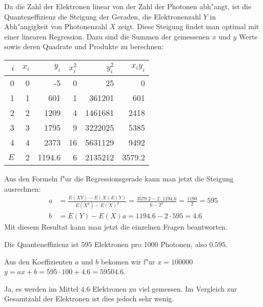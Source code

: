 \begin{loesung}
Da die Zahl der Elektronen linear von der Zahl der Photonen abh"angt,
ist die Quanteneffizienz die Steigung der Geraden, die Elektronenzahl $Y$
in Abh"angigkeit von Photonenzahl $X$ zeigt. Diese Steigung findet man
optimal mit einer linearen Regression. Dazu sind die Summen der gemessenen
$x$ und $y$ Werte sowie deren Quadrate und Produkte zu berechnen:
\begin{center}
\begin{tabular}{|r|rr|rr|r|}
\hline
$i$&$x_i$&$y_i$&$x_i^2$&$y_i^2$&$x_iy_i$\\
\hline
0&0&   -5&  0&     25&    0\\
1&1&  601&  1& 361201&  601\\
2&2& 1209&  4&1461681& 2418\\
3&3& 1795&  9&3222025& 5385\\
4&4& 2373& 16&5631129& 9492\\
\hline
$E$&2& 1194.6&6&2135212&3579.2\\
\hline
\end{tabular}
\end{center}
Aus den Formeln f"ur die Regressionsgerade kann man jetzt die
Steigung ausrechnen:
\begin{align*}
a&=\frac{E(XY)-E(X)E(Y)}{E(X^2)-E(X)^2}=
\frac{3579.2-2 \cdot 1194.6}{6-2^2}=\frac{1190}{2}=595
\\
b&=E(Y)-E(X)a=1194.6-2 \cdot 595=4.6
\end{align*}
Mit diesem Resultat kann man jetzt die einzelnen Fragen beantworten.
\begin{teilaufgaben}
\item Die Quanteneffizienz ist $595$ Elektronen pro 1000 Photonen, also
$0.595$.
\item
Aus den Koeffizienten $a$ und $b$ bekomen wir f"ur $x=100000$
$y=ax+b=595\cdot 100+4.6=59504.6$.
\item
Ja, es werden im Mittel 4.6 Elektronen zu viel gemessen. Im Vergleich
zur Gesamtzahl der Elektronen ist dies jedoch sehr wenig.
\end{teilaufgaben}
\end{loesung}
